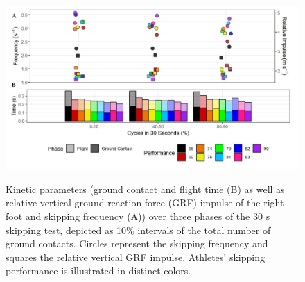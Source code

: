 \begin{figure}[h]
	\centering
	\includegraphics[width=\linewidth]{pix/fig3}
	\label{fig3}
	\caption{Kinetic parameters (ground contact and flight time (B) as well as relative vertical ground reaction force (GRF) impulse of the right foot and skipping frequency (A)) over three phases of the 30 s skipping test, depicted as 10\% intervals of the total number of ground contacts. Circles represent the skipping frequency and squares the relative vertical GRF impulse. Athletes' skipping performance is illustrated in distinct colors.}
\end{figure}